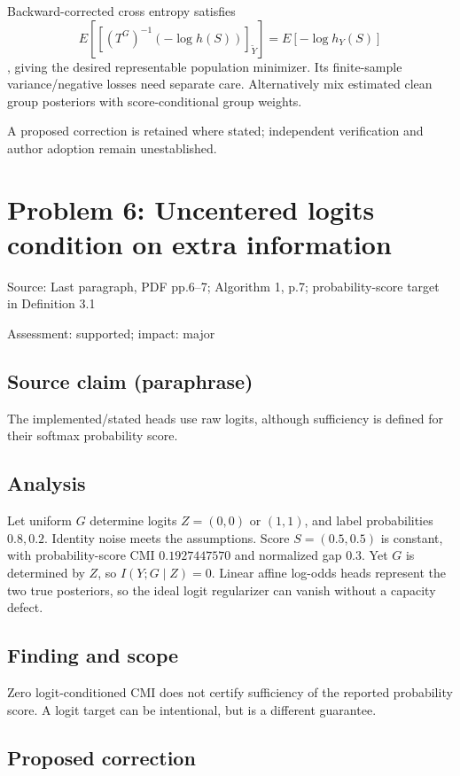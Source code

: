 \documentclass[11pt]{article}
\begin{document}
Backward-corrected cross entropy satisfies \[E[[(T^G)^{-1}(-\log h(S))]_{\widetilde Y}]=E[-\log h_Y(S)]\], giving the desired representable population minimizer. Its finite-sample variance/negative losses need separate care. Alternatively mix estimated clean group posteriors with score-conditional group weights.

A proposed correction is retained where stated; independent verification and author adoption remain unestablished.

\section*{Problem 6: Uncentered logits condition on extra information}

Source: Last paragraph, PDF pp.6–7; Algorithm 1, p.7; probability-score target in Definition 3.1

Assessment: supported; impact: major

\subsection*{Source claim (paraphrase)}

The implemented/stated heads use raw logits, although sufficiency is defined for their softmax probability score.

\subsection*{Analysis}

Let uniform \(G\) determine logits \(Z=(0,0)\) or \((1,1)\), and label probabilities \(0.8,0.2\). Identity noise meets the assumptions. Score \(S=(0.5,0.5)\) is constant, with probability-score CMI \(0.1927447570\) and normalized gap \(0.3\). Yet \(G\) is determined by \(Z\), so \(I(Y;G\mid Z)=0\). Linear affine log-odds heads represent the two true posteriors, so the ideal logit regularizer can vanish without a capacity defect.

\subsection*{Finding and scope}

Zero logit-conditioned CMI does not certify sufficiency of the reported probability score. A logit target can be intentional, but is a different guarantee.

\subsection*{Proposed correction}
\end{document}
